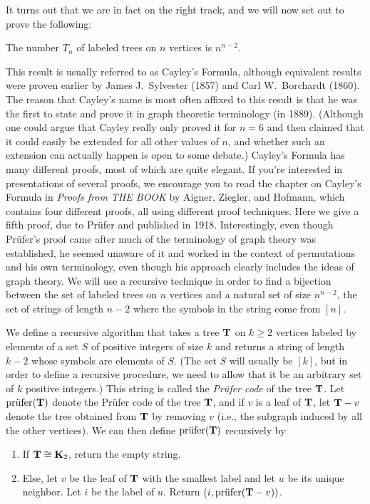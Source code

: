It turns out that we are in fact on the right track, and we will now
set out to prove the following:
\begin{theorem}\label{thm:cayley}
  The number $T_n$ of labeled trees on $n$ vertices is $n^{n-2}$.
\end{theorem}
\noindent This result is usually referred to as Cayley's Formula,
although equivalent results were proven earlier by James J.\ Sylvester
(1857) and Carl W.\ Borchardt (1860). The reason that Cayley's name is
most often affixed to this result is that he was the first to state
and prove it in graph theoretic terminology (in 1889). (Although one
could argue that Cayley really only proved it for $n=6$ and then
claimed that it could easily be extended for all other values of $n$,
and whether such an extension can actually happen is open to some
debate.) Cayley's Formula has many different proofs, most of which are
quite elegant. If you're interested in presentations of several
proofs, we encourage you to read the chapter on Cayley's Formula in
\textit{Proofs from THE BOOK} by Aigner, Ziegler, and Hofmann, which
contains four different proofs, all using different proof
techniques. Here we give a fifth proof, due to Pr\"ufer and published
in 1918. Interestingly, even though Pr\"ufer's proof came after much
of the terminology of graph theory was established, he seemed unaware
of it and worked in the context of permutations and his own
terminology, even though his approach clearly includes the ideas of
graph theory. We will use a recursive technique in order to find a
bijection between the set of labeled trees on $n$ vertices and a
natural set of size $n^{n-2}$, the set of strings of length $n-2$
where the symbols in the string come from $[n]$.

We define a recursive algorithm that takes a tree $\mathbf{T}$ on $k\geq 2$
vertices labeled by elements of a set $S$ of positive integers of size
$k$ and returns a string of length $k-2$ whose symbols are elements of
$S$. (The set $S$ will usually be $[k]$, but in order to define a
recursive procedure, we need to allow that it be an arbitrary set of
$k$ positive integers.) This string is called the \textit{Pr\"ufer
  code} of the tree $\mathbf{T}$. Let $\mbox{pr\"ufer}(\mathbf{T})$ denote the
Pr\"ufer code of the tree $\mathbf{T}$, and if $v$ is a leaf of $\mathbf{T}$, let
$\mathbf{T}-v$ denote the tree obtained from $\mathbf{T}$ by removing $v$ (i.e.,
the subgraph induced by all the other vertices). We can then define
$\mbox{pr\"ufer}(\mathbf{T})$ recursively by
\begin{enumerate}
\item If $\mathbf{T}\cong \mathbf{K}_2$, return the empty string.
\item Else, let $v$ be the leaf of $\mathbf{T}$ with the smallest label
  and let $u$ be its unique neighbor. Let $i$ be the label of
  $u$. Return $(i,\mbox{pr\"ufer}(\mathbf{T}-v))$.
\end{enumerate}

